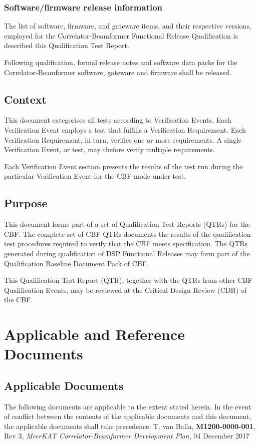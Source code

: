 \subsection{Software/firmware release information}
The list of software, firmware, and gateware items, and their respective versions, employed for the Correlator-Beamformer Functional Release Qualification is described this Qualification Test Report.

Following qualification, formal release notes and software data packs for the Correlator-Beamformer software, gateware and firmware shall be released.
\section{Context}
This document categorises all tests according to Verification Events. Each Verification Event employs a test that fulfills a Verification Requirement. Each Verification Requirement, in turn, verifies one or more requirements. A single Verification Event, or test, may thefore verify multiple requirements.

Each Verification Event section presents the results of the test run during the particular Verification Event for the CBF mode under test.
\section{Purpose}
This document forms part of a set of Qualification Test Reports (QTRs) for the
CBF. The complete set of CBF QTRs documents the results of the qualification
test procedures required to verify that the CBF meets specification. The QTRs
generated during qualification of DSP Functional Releases may form part of the
Qualification Baseline Document Pack of CBF.\newline

This Qualification Test Report (QTR), together with the QTRs from other CBF Qualification Events, may be reviewed at the Critical Design Review (CDR) of the CBF.
\chapter{Applicable and Reference Documents}
\section{Applicable Documents}
The following documents are applicable to the extent stated herein. In the event of conflict between the contents of the applicable documents and this document, the applicable documents shall take precedence:\newline\newline
[1]\hspace{10mm} T. van Balla, {\bf M1200-0000-001}, Rev 3, {\it MeerKAT Correlator-Beamformer Development Plan}, 04 December 2017\newline\
